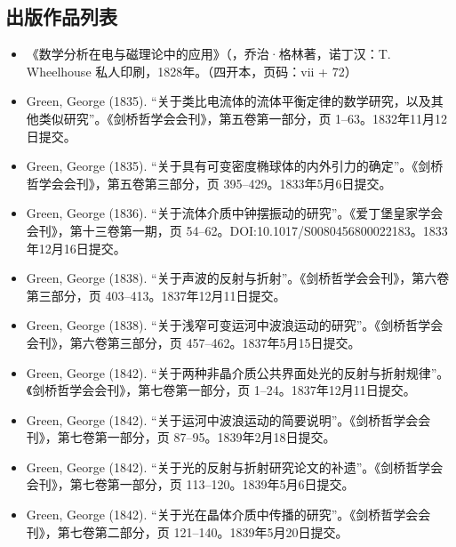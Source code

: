 \subsection{出版作品列表}
\begin{itemize}
\item 《数学分析在电与磁理论中的应用》（，乔治·格林著，诺丁汉：T. Wheelhouse 私人印刷，1828年。（四开本，页码：vii + 72）
\item Green, George (1835). “关于类比电流体的流体平衡定律的数学研究，以及其他类似研究”。《剑桥哲学会会刊》，第五卷第一部分，页 1–63。1832年11月12日提交。
\item Green, George (1835). “关于具有可变密度椭球体的内外引力的确定”。《剑桥哲学会会刊》，第五卷第三部分，页 395–429。1833年5月6日提交。
\item Green, George (1836). “关于流体介质中钟摆振动的研究”。《爱丁堡皇家学会会刊》，第十三卷第一期，页 54–62。DOI:10.1017/S0080456800022183。1833年12月16日提交。
\item Green, George (1838). “关于声波的反射与折射”。《剑桥哲学会会刊》，第六卷第三部分，页 403–413。1837年12月11日提交。
\item Green, George (1838). “关于浅窄可变运河中波浪运动的研究”。《剑桥哲学会会刊》，第六卷第三部分，页 457–462。1837年5月15日提交。
\item Green, George (1842). “关于两种非晶介质公共界面处光的反射与折射规律”。《剑桥哲学会会刊》，第七卷第一部分，页 1–24。1837年12月11日提交。
\item Green, George (1842). “关于运河中波浪运动的简要说明”。《剑桥哲学会会刊》，第七卷第一部分，页 87–95。1839年2月18日提交。
\item Green, George (1842). “关于光的反射与折射研究论文的补遗”。《剑桥哲学会会刊》，第七卷第一部分，页 113–120。1839年5月6日提交。
\item Green, George (1842). “关于光在晶体介质中传播的研究”。《剑桥哲学会会刊》，第七卷第二部分，页 121–140。1839年5月20日提交。
\end{itemize}
